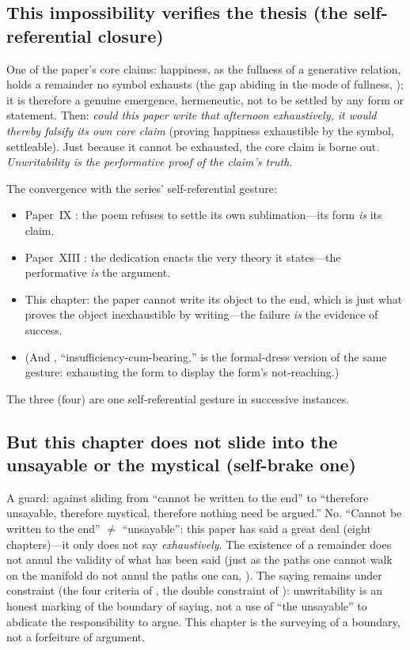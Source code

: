 \subsection{This impossibility verifies the thesis (the self-referential closure)}
\label{p19:sub:unwrit-verify}

One of the paper's core claims: happiness, as the fullness of a generative relation, holds a remainder no symbol exhausts (the gap abiding in the mode of fullness, ); it is therefore a genuine emergence, hermeneutic, not to be settled by any form or statement. Then: \emph{could this paper write that afternoon exhaustively, it would thereby falsify its own core claim} (proving happiness exhaustible by the symbol, settleable). Just because it cannot be exhausted, the core claim is borne out. \emph{Unwritability is the performative proof of the claim's truth.}

The convergence with the series' self-referential gesture:
\begin{itemize}
  \item Paper~IX \parencite{paperix}: the poem refuses to settle its own sublimation---its form \emph{is} its claim.
  \item Paper~XIII \parencite{paperxiii}: the dedication enacts the very theory it states---the performative \emph{is} the argument.
  \item This chapter: the paper cannot write its object to the end, which is just what proves the object inexhaustible by writing---the failure \emph{is} the evidence of success.
  \item (And , ``insufficiency-cum-bearing,'' is the formal-dress version of the same gesture: exhausting the form to display the form's not-reaching.)
\end{itemize}
The three (four) are one self-referential gesture in successive instances.

\subsection{But this chapter does not slide into the unsayable or the mystical (self-brake one)}
\label{p19:sub:unwrit-brake1}

A guard: against sliding from ``cannot be written to the end'' to ``therefore unsayable, therefore mystical, therefore nothing need be argued.'' No. ``Cannot be written to the end'' $\neq$ ``unsayable'': this paper has said a great deal (eight chapters)---it only does not say \emph{exhaustively}. The existence of a remainder does not annul the validity of what has been said (just as the paths one cannot walk on the manifold do not annul the paths one can, ). The saying remains under constraint (the four criteria of , the double constraint of ): unwritability is an honest marking of the boundary of saying, not a use of ``the unsayable'' to abdicate the responsibility to argue. This chapter is the surveying of a boundary, not a forfeiture of argument.

